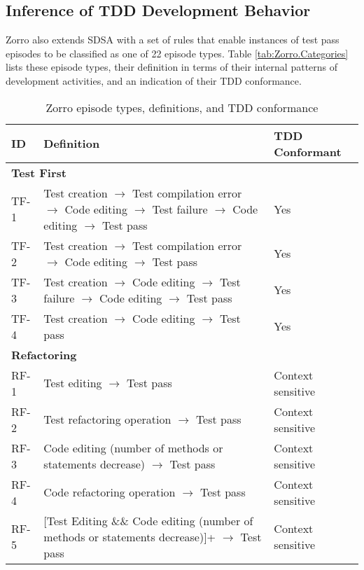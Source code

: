 \subsection{Inference of TDD Development Behavior}
\label{sec:ZorroBehaviorCategory}

Zorro also extends SDSA with a set of rules that enable instances 
of test pass episodes to be classified as one of 22 episode types.  
Table \ref{tab:Zorro.Categories} lists these episode types,
their definition in terms of their internal patterns of
development activities, and an indication of their TDD 
conformance. 
\begin{sidewaystable}[htbp]
\centering
  \caption{Zorro episode types, definitions, and TDD conformance}
  \begin{tabular}{|l|p{18.5cm}|l|}
  \hline
   \textbf{ID}  & \textbf{Definition}   & \textbf{TDD Conformant} \\ \hline
   \multicolumn{3}{|l|}{\textbf{Test First}} \\ \hline
   TF-1 & Test creation $\rightarrow$ Test compilation error $\rightarrow$ 
          Code editing $\rightarrow$ Test failure $\rightarrow$ Code editing 
          $\rightarrow$ Test pass & Yes \\ \hline
   TF-2 & Test creation $\rightarrow$ Test compilation error $\rightarrow$ 
          Code editing $\rightarrow$ Test pass & Yes \\ \hline
   TF-3 & Test creation $\rightarrow$ Code editing $\rightarrow$ Test failure 
          $\rightarrow$ Code editing $\rightarrow$ Test pass    & Yes \\ \hline
   TF-4 & Test creation $\rightarrow$ Code editing $\rightarrow$ Test pass      
        & Yes \\ \hline

   \multicolumn{3}{|l|}{\textbf{Refactoring}} \\ \hline
   RF-1 & Test editing $\rightarrow$ Test pass  & Context sensitive \\ \hline
   RF-2 & Test refactoring operation $\rightarrow$ Test pass    & Context sensitive \\ \hline
   RF-3 & Code editing (number of methods or statements decrease) $\rightarrow$ Test pass       
        & Context sensitive \\ \hline
   RF-4 & Code refactoring operation $\rightarrow$ Test pass    & Context sensitive \\ \hline
   RF-5 & [Test Editing \&\& Code editing (number of methods or 
          statements decrease)]+ $\rightarrow$ Test pass        
        & Context sensitive \\ \hline
   

\end{tabular}
\end{sidewaystable}
